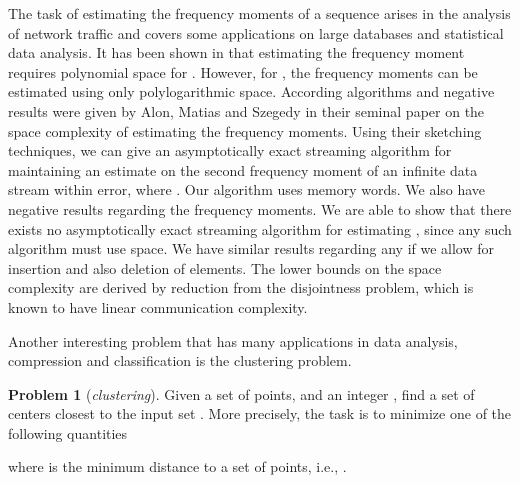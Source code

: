 \documentclass[a4paper,11pt,oneside,english,onecolumn]{article}
\theoremstyle{definition}
\newtheorem{problem}{Problem}
\begin{document}
The task of estimating the frequency moments of a sequence arises in the analysis of network traffic and covers some applications on large databases and statistical data analysis. It has been shown in \cite{ImpFreqLowBound} that estimating the  frequency moment requires polynomial space for . However, for , the frequency moments can be estimated using only polylogarithmic space. According algorithms and negative results were given by Alon, Matias and Szegedy in their seminal paper \cite{ApproxFreqMom} on the space complexity of estimating the frequency moments.
Using their sketching techniques, we can give an asymptotically exact streaming algorithm for maintaining an estimate on the second frequency moment of an infinite data stream within  error, where . Our algorithm uses  memory words.
We also have negative results regarding the frequency moments. We are able to show that there exists no asymptotically exact streaming algorithm for estimating , since any such algorithm must use  space. We have similar results regarding any  if we allow for insertion and also deletion of elements.
The lower bounds on the space complexity are derived by reduction from the disjointness problem, which is known to have linear communication complexity.

Another interesting problem that has many applications in data analysis, compression and classification is the clustering problem.

\begin{problem}[\emph{clustering}] Given a set  of  points, and an integer , find a set  of  centers closest to the input set . More precisely, the task is to minimize one of the following quantities

where  is the minimum distance to a set of points, i.e., .
\end{problem}
\end{document}
